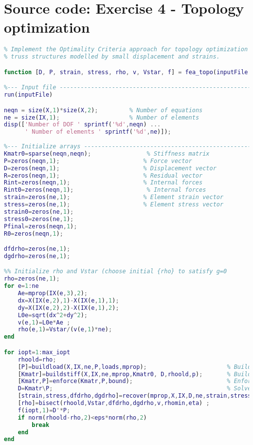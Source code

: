 \chapter{Source code: Exercise 4 - Topology optimization}
\vspace{2mm}
\begin{lstlisting}[language=Matlab, caption = FE implementation for topology optimization, label=lst:CodeTopo]
% Exercise 4.1 
% Implement the Optimality Criteria approach for topology optimization of
% truss structures modelled by small displacement and strains.

function [D, P, strain, stress, rho, v, Vstar, f] = fea_topo(inputFile,eta,p,Vstar,rhomin,eps,max_iopt)

%--- Input file ----------------------------------------------------------%
run(inputFile)

neqn = size(X,1)*size(X,2);         % Number of equations
ne = size(IX,1);                    % Number of elements
disp(['Number of DOF ' sprintf('%d',neqn) ...
      ' Number of elements ' sprintf('%d',ne)]);
 
%--- Initialize arrays ---------------------------------------------------%
Kmatr0=sparse(neqn,neqn);                % Stiffness matrix
P=zeros(neqn,1);                        % Force vector
D=zeros(neqn,1);                        % Displacement vector
R=zeros(neqn,1);                        % Residual vector
Rint=zeros(neqn,1);                     % Internal forces
Rint0=zeros(neqn,1);                     % Internal forces
strain=zeros(ne,1);                     % Element strain vector
stress=zeros(ne,1);                     % Element stress vector
strain0=zeros(ne,1);
stress0=zeros(ne,1);                    
Pfinal=zeros(neqn,1);
R0=zeros(neqn,1);

dfdrho=zeros(ne,1);
dgdrho=zeros(ne,1);

%% Initialize rho and Vstar (choose initial {rho} to satisfy g=0
rho=zeros(ne,1);
for e=1:ne
    Ae=mprop(IX(e,3),2);
    dx=X(IX(e,2),1)-X(IX(e,1),1);
    dy=X(IX(e,2),2)-X(IX(e,1),2);
    L0e=sqrt(dx^2+dy^2);
    v(e,1)=L0e*Ae ;
    rho(e,1)=Vstar/(v(e,1)*ne);
end

for iopt=1:max_iopt
    rhoold=rho;
    [P]=buildload(X,IX,ne,P,loads,mprop);                       % Build global load vector    
    [Kmatr]=buildstiff(X,IX,ne,mprop,Kmatr0, D,rhoold,p);       % Build global stiffness matrix
    [Kmatr,P]=enforce(Kmatr,P,bound);                           % Enforce boundary conditions
    D=Kmatr\P;                                                  % Solve system of equations
    [strain,stress,dfdrho,dgdrho]=recover(mprop,X,IX,D,ne,strain,stress,rhoold,v,Vstar,p); % Calculate element 
    [rho]=bisect(rhoold,Vstar,dfdrho,dgdrho,v,rhomin,eta) ;
    f(iopt,1)=D'*P;
    if norm(rhoold-rho,2)<eps*norm(rho,2)
        break
    end
end


\end{lstlisting}
